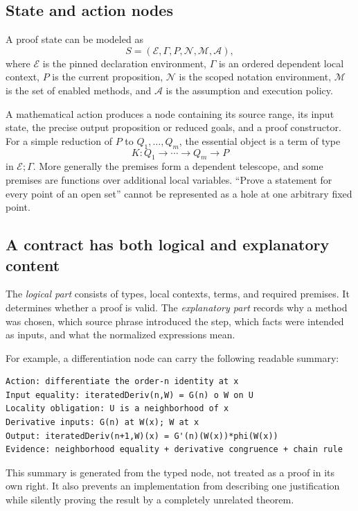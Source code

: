 \documentclass[11pt,a4paper]{article}
\newcommand{\Env}{\mathcal E}
\newcommand{\Pol}{\mathcal A}
\theoremstyle{remark}
\begin{document}
\subsection{State and action nodes}

A proof state can be modeled as
\[
S=(\Env,\Gamma,P,\mathcal N,\mathcal M,\Pol),
\]
where $\Env$ is the pinned declaration environment, $\Gamma$ is an ordered dependent local context, $P$ is the current proposition, $\mathcal N$ is the scoped notation environment, $\mathcal M$ is the set of enabled methods, and $\Pol$ is the assumption and execution policy.

A mathematical action produces a node containing its source range, its input state, the precise output proposition or reduced goals, and a proof constructor. For a simple reduction of $P$ to $Q_1,\ldots,Q_m$, the essential object is a term of type
\[
K:Q_1\to\cdots\to Q_m\to P
\]
in $\Env;\Gamma$. More generally the premises form a dependent telescope, and some premises are functions over additional local variables. ``Prove a statement for every point of an open set'' cannot be represented as a hole at one arbitrary fixed point.

\subsection{A contract has both logical and explanatory content}

The \emph{logical part} consists of types, local contexts, terms, and required premises. It determines whether a proof is valid. The \emph{explanatory part} records why a method was chosen, which source phrase introduced the step, which facts were intended as inputs, and what the normalized expressions mean.

For example, a differentiation node can carry the following readable summary:
\begin{lstlisting}
Action: differentiate the order-n identity at x
Input equality: iteratedDeriv(n,W) = G(n) o W on U
Locality obligation: U is a neighborhood of x
Derivative inputs: G(n) at W(x); W at x
Output: iteratedDeriv(n+1,W)(x) = G'(n)(W(x))*phi(W(x))
Evidence: neighborhood equality + derivative congruence + chain rule
\end{lstlisting}
This summary is generated from the typed node, not treated as a proof in its own right. It also prevents an implementation from describing one justification while silently proving the result by a completely unrelated theorem.
\end{document}

